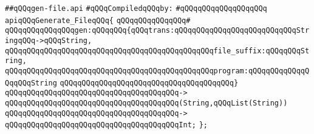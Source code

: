 \label{src/lib/compiler/back/low/tools/line-number-db/generate-file.api}
\verb|##qQQqgen-file.api|\newline
\newline
\verb|#qQQqCompiledqQQqby:|\newline
\verb|#qQQqqQQqqQQqqQQqqQQq|\newline
\newline
\verb|apiqQQqGenerate_FileqQQq{|\newline
\verb|qQQqqQQqqQQqqQQq#|\newline
\verb|qQQqqQQqqQQqqQQqgen:qQQqqQQq{qQQqtrans:qQQqqQQqqQQqqQQqqQQqqQQqqQQqStringqQQq->qQQqString,|\newline
\verb|qQQqqQQqqQQqqQQqqQQqqQQqqQQqqQQqqQQqqQQqqQQqqQQqfile_suffix:qQQqqQQqString,|\newline
\verb|qQQqqQQqqQQqqQQqqQQqqQQqqQQqqQQqqQQqqQQqqQQqqQQqprogram:qQQqqQQqqQQqqQQqqQQqString|\newline
\verb|qQQqqQQqqQQqqQQqqQQqqQQqqQQqqQQqqQQqqQQq}|\newline
\verb|qQQqqQQqqQQqqQQqqQQqqQQqqQQqqQQqqQQqqQQq->|\newline
\verb|qQQqqQQqqQQqqQQqqQQqqQQqqQQqqQQqqQQqqQQq(String,qQQqList(String))|\newline
\verb|qQQqqQQqqQQqqQQqqQQqqQQqqQQqqQQqqQQqqQQq->|\newline
\verb|qQQqqQQqqQQqqQQqqQQqqQQqqQQqqQQqqQQqqQQqInt;|\newline
\verb|};|\newline

